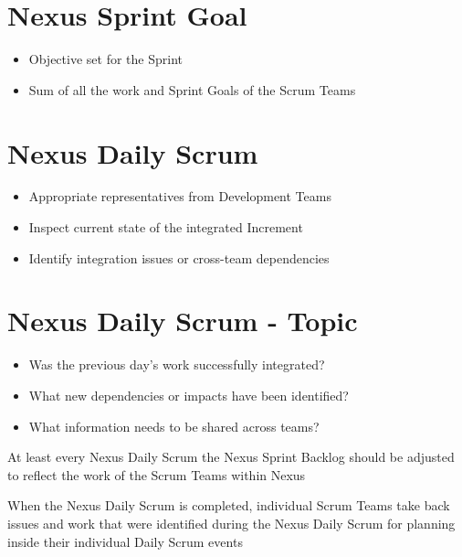 \documentclass[a4paper,11pt,twocolumn]{article}
\begin{document}
\section*{Nexus Sprint Goal}
\begin{itemize}
	\item Objective set for the Sprint
	\item Sum of all the work and Sprint Goals of the Scrum Teams
\end{itemize}

\section*{Nexus Daily Scrum}
\begin{itemize}
	\item Appropriate representatives from Development Teams
	\item Inspect current state of the integrated Increment
	\item Identify integration issues or cross-team dependencies
\end{itemize}

\section*{Nexus Daily Scrum - Topic}
\begin{itemize}
	\item Was the previous day's work successfully integrated?
	\item What new dependencies or impacts have been identified?
	\item What information needs to be shared across teams?
\end{itemize}

\begin{tcolorbox}[colback=black!8!white,colframe=gray!50!black,title=Note,sharp corners,fonttitle=\normalsize\bfseries,fontupper=\normalsize]
	At least every Nexus Daily Scrum the Nexus Sprint Backlog should be adjusted to reflect the work of the Scrum Teams within Nexus
\end{tcolorbox}

\begin{tcolorbox}[colback=black!8!white,colframe=gray!50!black,title=Note,sharp corners,fonttitle=\normalsize\bfseries,fontupper=\normalsize]
	When the Nexus Daily Scrum is completed, individual Scrum Teams take back issues and work that were identified during the Nexus Daily Scrum for planning inside their individual Daily Scrum events
\end{tcolorbox}
\end{document}
